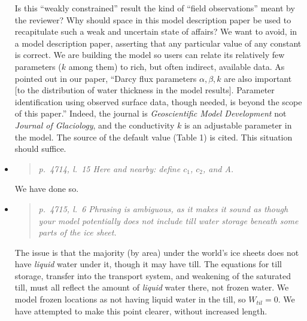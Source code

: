 \documentclass[11pt,reqno]{amsart}
\newcommand{\reply}[2]{
\medskip\medskip
\item  \begin{quote}
\emph{#1}
\end{quote}

\medskip
\noindent #2}
\begin{document}
\begin{itemize}
{Is this ``weakly constrained'' result the kind of ``field observations'' meant by the reviewer?  Why should space in this model description paper be used to recapitulate such a weak and uncertain state of affairs?  We want to avoid, in a model description paper, asserting that any particular value of any constant is correct.  We are building the model so users can relate its relatively few parameters ($k$ among them) to rich, but often indirect, available data.  As pointed out in our paper, ``Darcy flux parameters $\alpha,\beta,k$ are also important [to the distribution of water thickness in the model results].  Parameter identification using observed surface data, though needed, is beyond the scope of this paper.''  Indeed, the journal is \emph{Geoscientific Model Development} not \emph{Journal of Glaciology}, and the conductivity $k$ is an adjustable parameter in the model.  The source of the default value (Table 1) is cited.  This situation should suffice.}

\reply{p.~4714, l.~15 Here and nearby: define $c_1$, $c_2$, and A.}
{We have done so.}

\reply{p.~4715, l.~6 Phrasing is ambiguous, as it makes it sound as though your model
potentially does not include till water storage beneath some parts of the ice sheet.}
{The issue is that the majority (by area) under the world's ice sheets does not have \emph{liquid} water under it, though it may have till.  The equations for till storage, transfer into the transport system, and weakening of the saturated till, must all reflect the amount of \emph{liquid} water there, not frozen water.  We model frozen locations as not having liquid water in the till, so $W_{til}=0$.  We have attempted to make this point clearer, without increased length.}


\end{itemize}
\end{document}
